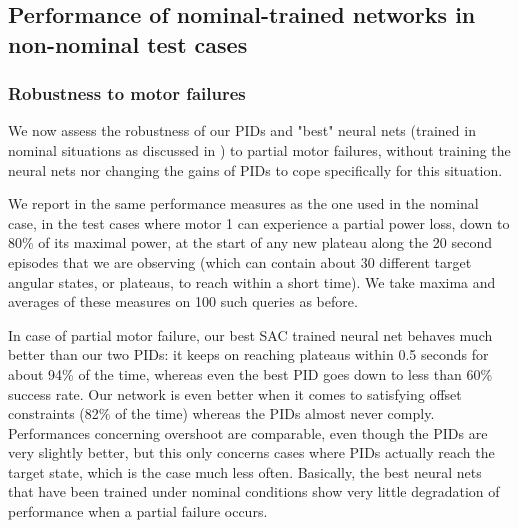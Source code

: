 \documentclass[anonymous=true,format=sigconf, screen=true, review=false]{acmart}
\begin{document}




\subsection{Performance of nominal-trained networks in non-nominal test cases}

\label{sec:expnonnominal}

\subsubsection{Robustness to motor failures}

We now assess the robustness of our PIDs and "best" neural nets (trained in nominal situations as discussed in  ) to partial motor failures, without training the neural nets nor changing the gains of PIDs to cope specifically for this situation. 

We report in  
the same performance measures as the one used in the nominal case, in the test cases where motor 1 can experience a partial power loss, down to 80\% of its maximal power, at the start of any new plateau along the 20 second episodes that we are observing (which can contain about 30 different target angular states, or plateaus, to reach within a short time). We take maxima and averages of these measures on 100 such queries as before. %

In case of partial motor failure, our best SAC trained neural net behaves much better than our two PIDs: it keeps on reaching plateaus within 0.5 seconds for about 94\% of the time, whereas even the best PID goes down to less than 60\% success rate. Our network is even better when it comes to satisfying offset constraints (82\% of the time) whereas the PIDs almost never comply. Performances concerning overshoot are comparable, even though the PIDs are very slightly better, but this only concerns cases where PIDs actually reach the target state, which is the case much less often. Basically, the best neural nets that have been trained under nominal conditions show very little degradation of performance when a partial failure occurs.  

\end{document}
